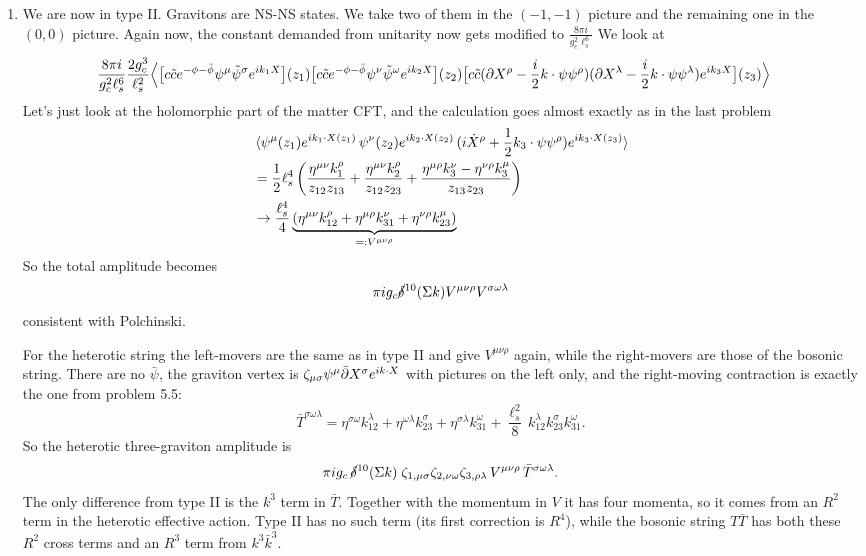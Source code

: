 \documentclass[11pt, class=article, crop=false]{standalone}
\begin{document}
\begin{enumerate}
	\item We are now in type II. Gravitons are NS-NS states. We take two of them in the $(-1, -1)$ picture and the remaining one in the $(0, 0)$ picture. Again now, the constant demanded from unitarity now gets modified to $\frac{8 \pi i}{g_c^2 \ell_s^6}$ We look at
	\[
	\begin{aligned}
		&\frac{8 \pi i}{g_{c}^2 \ell_s^6} \frac{2 g_{c}^3}{\ell_s^2} \Big< \big[c \tilde c e^{-\phi - \bar \phi} \psi^\mu \tilde \psi^\sigma e^{i k_1 X} \big] (z_1) \big[c \tilde c e^{-\phi - \bar \phi} \psi^\nu \tilde \psi^\omega e^{i k_2 X}\big] (z_2) \big[ c \tilde c(\partial X^\rho - \frac i2 k \cdot \psi \psi^\rho) (\partial X^\lambda - \frac i2 k \cdot \psi \psi^\lambda) e^{i k_3 X} \big] (z_3)\Big> 
	\end{aligned}
	\]
	Let's just look at the holomorphic part of the matter CFT, and the calculation goes almost exactly as in the last problem
	\[
	\begin{aligned}
		&\braket{\psi^\mu (z_1) e^{i k_1 \cdot X(z_1)}\, \psi^\nu (z_2) e^{i k_2 \cdot X(z_2)} \, (i \dot X^\rho + \frac12 k_3 \cdot \psi \psi^\rho) e^{i k_3 \cdot X(z_3)} } \\
		&= \frac12 \ell_s^4 \left(\frac{\eta^{\mu \nu}k_1^\rho}{z_{12} z_{13}} + \frac{\eta^{\mu \nu} k_2^\rho}{z_{12} z_{23}} + \frac{\eta^{\mu \rho} k_3^\nu - \eta^{\nu \rho} k_3^\mu}{z_{13} z_{23}} \right)\\
		& \rightarrow  \frac{\ell_s^4}{4} \underbrace{\left(\eta^{\mu \nu} k_{12}^\rho + \eta^{\mu \rho} k_{31}^\nu + \eta^{\nu \rho} k_{23}^\mu \right)}_{ =: V^{\mu \nu \rho}}
	\end{aligned}
	\]
	So the total amplitude becomes
	\[
		\pi i g_c \cancel\delta^{10}(\Sigma k) V^{\mu \nu \rho} V^{\sigma \omega \lambda}
	\]
	consistent with Polchinski.
	
	For the heterotic string the left-movers are the same as in type II and give $V^{\mu \nu \rho}$ again, while the right-movers are those of the bosonic string. There are no $\bar \psi$, the graviton vertex is $\zeta_{\mu \sigma} \psi^\mu \bar {\partial} X^\sigma e^{i k \cdot X}$ with pictures on the left only, and the right-moving contraction is exactly the one from problem 5.5:
	\[
		\bar T^{\sigma \omega \lambda} = \eta^{\sigma \omega} k_{12}^\lambda + \eta^{\omega \lambda} k_{23}^\sigma + \eta^{\sigma \lambda} k_{31}^\omega + \frac{\ell_s^2}{8}\, k_{12}^\lambda k_{23}^\sigma k_{31}^\omega .
	\]
	So the heterotic three-graviton amplitude is
	\[
		\pi i g_c\, \cancel\delta^{10}(\Sigma k)\; \zeta_{1, \mu \sigma} \zeta_{2, \nu \omega} \zeta_{3, \rho \lambda}\, V^{\mu \nu \rho}\, \bar T^{\sigma \omega \lambda}.
	\]
	The only difference from type II is the $k^3$ term in $\bar T$. Together with the momentum in $V$ it has four momenta, so it comes from an $R^2$ term in the heterotic effective action. Type II has no such term (its first correction is $R^4$), while the bosonic string $T \bar T$ has both these $R^2$ cross terms and an $R^3$ term from $k^3 \bar k^3$.
	

\end{enumerate}
\end{document}
